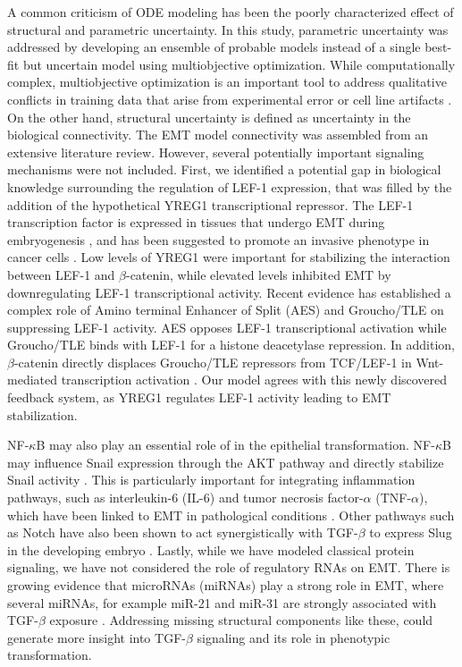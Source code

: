 \documentclass[12pt]{article}
\begin{document}
A common criticism of ODE modeling has been the poorly characterized effect of structural and parametric uncertainty.
In this study, parametric uncertainty was addressed by developing an ensemble of probable models instead of a single best-fit but uncertain model using multiobjective optimization.
While computationally complex, multiobjective optimization is an important tool to address qualitative conflicts in training data that arise from experimental error or cell line artifacts \citep{Handl:2007fk}. On the other hand, structural uncertainty is defined as uncertainty in the biological connectivity.
The EMT model connectivity was assembled from an extensive literature review. However, several potentially important signaling mechanisms were not included.
First, we identified a potential gap in biological knowledge surrounding the regulation of LEF-1 expression, that was filled by the addition of the hypothetical YREG1 transcriptional repressor.
The LEF-1 transcription factor is expressed in tissues that undergo EMT during embryogenesis \citep{Vega:2004qf,Nawshad:2003ff},
and has been suggested to promote an invasive phenotype in cancer cells \citep{Cano:2000kh,Kim:2002lh}.
Low levels of YREG1 were important for stabilizing the interaction between LEF-1 and $\beta$-catenin, while elevated levels inhibited EMT by downregulating LEF-1 transcriptional activity.
Recent evidence has established a complex role of Amino terminal Enhancer of Split (AES) and Groucho/TLE on suppressing LEF-1 activity.
AES opposes LEF-1 transcriptional activation while Groucho/TLE binds with LEF-1 for a histone deacetylase repression.
In addition, $\beta$-catenin directly displaces Groucho/TLE repressors from TCF/LEF-1 in Wnt-mediated transcription activation \citep{Arce:2009pr, Grumolato2013}.
Our model agrees with this newly discovered feedback system, as YREG1 regulates LEF-1 activity leading to EMT stabilization.

NF-$\kappa$B may also play an essential role of in the epithelial transformation.
NF-$\kappa$B may influence Snail expression through the AKT pathway and directly stabilize Snail activity \citep{Wu:2009cr}.  This is particularly important for integrating inflammation pathways, such as interleukin-6 (IL-6) and tumor necrosis factor-$\alpha$ (TNF-$\alpha$), which have been linked to EMT in pathological conditions \citep{Sullivan:2009bh}.
Other pathways such as Notch have also been shown to act synergistically with TGF-$\beta$ to express Slug in the developing embryo \citep{Niessen:2008nx}.
Lastly, while we have modeled classical protein signaling, we have not considered the role of regulatory RNAs on EMT.
There is growing evidence that microRNAs (miRNAs) play a strong role in EMT, where several miRNAs, for example miR-21 and miR-31 are strongly associated with TGF-$\beta$ exposure \citep{Bullock:2012aa}. Addressing missing structural components like these, could generate more insight into TGF-$\beta$ signaling and its role in phenotypic transformation.
\end{document}
